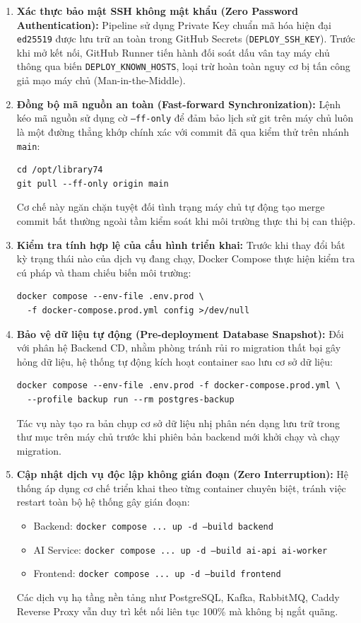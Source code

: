 \begin{enumerate}
    \item \textbf{Xác thực bảo mật SSH không mật khẩu (Zero Password Authentication):}
    Pipeline sử dụng Private Key chuẩn mã hóa hiện đại \texttt{ed25519} được lưu trữ an toàn trong GitHub Secrets (\texttt{DEPLOY\_SSH\_KEY}). Trước khi mở kết nối, GitHub Runner tiến hành đối soát dấu vân tay máy chủ thông qua biến \texttt{DEPLOY\_KNOWN\_HOSTS}, loại trừ hoàn toàn nguy cơ bị tấn công giả mạo máy chủ (Man-in-the-Middle).

    \item \textbf{Đồng bộ mã nguồn an toàn (Fast-forward Synchronization):}
    Lệnh kéo mã nguồn sử dụng cờ \texttt{--ff-only} để đảm bảo lịch sử git trên máy chủ luôn là một đường thẳng khớp chính xác với commit đã qua kiểm thử trên nhánh \texttt{main}:
\begin{verbatim}
cd /opt/library74
git pull --ff-only origin main
\end{verbatim}
    Cơ chế này ngăn chặn tuyệt đối tình trạng máy chủ tự động tạo merge commit bất thường ngoài tầm kiểm soát khi môi trường thực thi bị can thiệp.

    \item \textbf{Kiểm tra tính hợp lệ của cấu hình triển khai:}
    Trước khi thay đổi bất kỳ trạng thái nào của dịch vụ đang chạy, Docker Compose thực hiện kiểm tra cú pháp và tham chiếu biến môi trường:
\begin{verbatim}
docker compose --env-file .env.prod \
  -f docker-compose.prod.yml config >/dev/null
\end{verbatim}

    \item \textbf{Bảo vệ dữ liệu tự động (Pre-deployment Database Snapshot):}
    Đối với phân hệ Backend CD, nhằm phòng tránh rủi ro migration thất bại gây hỏng dữ liệu, hệ thống tự động kích hoạt container sao lưu cơ sở dữ liệu:
\begin{verbatim}
docker compose --env-file .env.prod -f docker-compose.prod.yml \
  --profile backup run --rm postgres-backup
\end{verbatim}
    Tác vụ này tạo ra bản chụp cơ sở dữ liệu nhị phân nén dạng  lưu trữ trong thư mục  trên máy chủ trước khi phiên bản backend mới khởi chạy và chạy migration.

    \item \textbf{Cập nhật dịch vụ độc lập không gián đoạn (Zero Interruption):}
    Hệ thống áp dụng cơ chế triển khai theo từng container chuyên biệt, tránh việc restart toàn bộ hệ thống gây gián đoạn:
    \begin{itemize}[noitemsep]
        \item Backend: \texttt{docker compose ... up -d --build backend}
        \item AI Service: \texttt{docker compose ... up -d --build ai-api ai-worker}
        \item Frontend: \texttt{docker compose ... up -d --build frontend}
    \end{itemize}
    Các dịch vụ hạ tầng nền tảng như PostgreSQL, Kafka, RabbitMQ, Caddy Reverse Proxy vẫn duy trì kết nối liên tục 100\% mà không bị ngắt quãng.


\end{enumerate}
